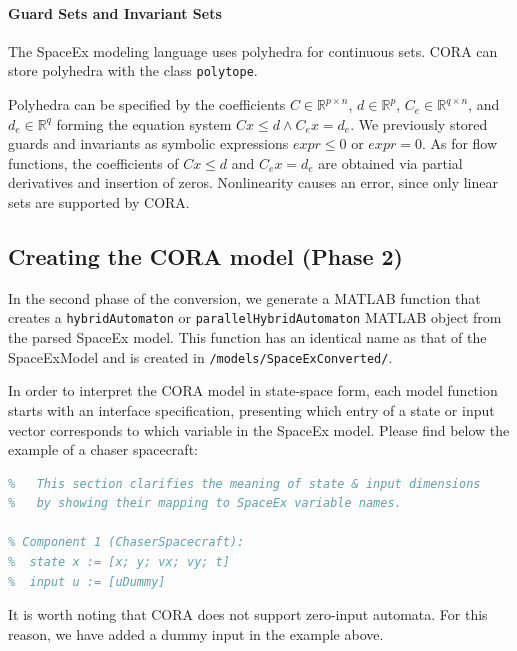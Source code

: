 \paragraph{Guard Sets and Invariant Sets}

The SpaceEx modeling language uses polyhedra for continuous sets.
CORA can store polyhedra with the class \texttt{polytope}.

Polyhedra can be specified by the coefficients $C\in\mathbb{R}^{p \times n}$, $d \in \mathbb{R}^{p}$, $C_e\in\mathbb{R}^{q \times n}$, and $d_e\in \mathbb{R}^{q}$ forming the equation system $C x \leq d \wedge C_e x = d_e$.
We previously stored guards and invariants as symbolic expressions $expr \leq 0$ or $expr = 0$. As for flow functions, the coefficients of $C x \leq d$ and $C_e x = d_e$ are obtained via partial derivatives and insertion of zeros. Nonlinearity causes an error, since only linear sets are supported by CORA.




\subsection{Creating the CORA model (Phase 2)} \label{sec:creatingCoraModel}

{\raggedright
In the second phase of the conversion, we generate a MATLAB function that creates a \texttt{hybridAutomaton} or \texttt{parallelHybridAutomaton} MATLAB object from the parsed SpaceEx model. This function has an identical name as that of the SpaceExModel and is created in \texttt{/models/SpaceExConverted/}. 
\par}

In order to interpret the CORA model in state-space form, each model function starts with an interface specification, presenting which entry of a state or input vector corresponds to which variable in the SpaceEx model. Please find below the example of a chaser spacecraft:
\begin{lstlisting}[language=matlab]
%% Interface Specification:
%   This section clarifies the meaning of state & input dimensions
%   by showing their mapping to SpaceEx variable names. 

% Component 1 (ChaserSpacecraft):
%  state x := [x; y; vx; vy; t]
%  input u := [uDummy]
\end{lstlisting}
It is worth noting that CORA does not support zero-input automata. For this reason, we have added a dummy input in the example above.



